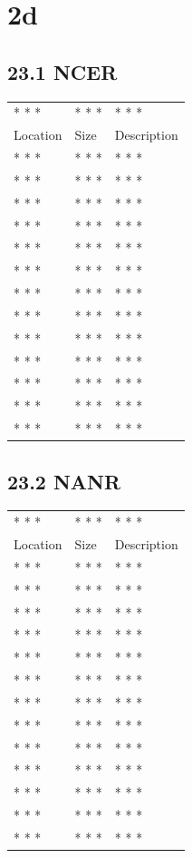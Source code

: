 \documentclass[
]{book}
\begin{document}
\hypertarget{d-1}{%
\chapter{2d}\label{d-1}}

\hypertarget{ncer}{%
\section{23.1 NCER}\label{ncer}}

\begin{longtable}[]{@{}lll@{}}
\toprule()
\endhead
* * * & * * * & * * * \\
Location & Size & Description \\
* * * & * * * & * * * \\
* * * & * * * & * * * \\
* * * & * * * & * * * \\
* * * & * * * & * * * \\
* * * & * * * & * * * \\
* * * & * * * & * * * \\
* * * & * * * & * * * \\
* * * & * * * & * * * \\
* * * & * * * & * * * \\
* * * & * * * & * * * \\
* * * & * * * & * * * \\
* * * & * * * & * * * \\
* * * & * * * & * * * \\
\bottomrule()
\end{longtable}

\hypertarget{nanr}{%
\section{23.2 NANR}\label{nanr}}

\begin{longtable}[]{@{}lll@{}}
\toprule()
\endhead
* * * & * * * & * * * \\
Location & Size & Description \\
* * * & * * * & * * * \\
* * * & * * * & * * * \\
* * * & * * * & * * * \\
* * * & * * * & * * * \\
* * * & * * * & * * * \\
* * * & * * * & * * * \\
* * * & * * * & * * * \\
* * * & * * * & * * * \\
* * * & * * * & * * * \\
* * * & * * * & * * * \\
* * * & * * * & * * * \\
* * * & * * * & * * * \\
* * * & * * * & * * * \\
\bottomrule()
\end{longtable}
\end{document}
